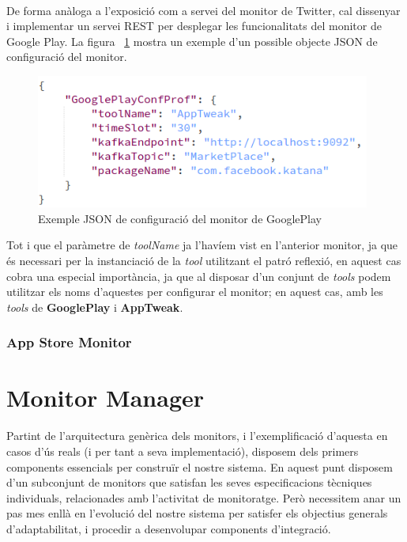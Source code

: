 \\

De forma anàloga a l'exposició com a servei del monitor de Twitter, cal dissenyar i implementar un servei REST per desplegar les funcionalitats del monitor de Google Play. La figura ~\ref{fig:Figura14} mostra un exemple d'un possible objecte JSON de configuració del monitor.\\

\begin{figure}[!h]
\centering
\includegraphics[width=11cm]{Figures/Figure14}
\decoRule
\caption[Exemple JSON de configuració del monitor de GooglePlay]{Exemple JSON de configuració del monitor de GooglePlay}
\label{fig:Figura14}
\end{figure}

Tot i que el paràmetre de \textit{toolName} ja l'havíem vist en l'anterior monitor, ja que és necessari per la instanciació de la \textit{tool} utilitzant el patró reflexió, en aquest cas cobra una especial importància, ja que al disposar d'un conjunt de \textit{tools} podem utilitzar els noms d'aquestes per configurar el monitor; en aquest cas, amb les \textit{tools} de \textbf{GooglePlay} i \textbf{AppTweak}.\\

\subsubsection{App Store Monitor}

\section{Monitor Manager}

Partint de l'arquitectura genèrica dels monitors, i l'exemplificació d'aquesta en casos d'ús reals (i per tant a seva implementació), disposem dels primers components essencials per construïr el nostre sistema. En aquest punt disposem d'un subconjunt de monitors que satisfan les seves especificacions tècniques individuals, relacionades amb l'activitat de monitoratge. Però necessitem anar un pas mes enllà en l'evolució del nostre sistema per satisfer els objectius generals d'adaptabilitat, i procedir a desenvolupar components d'integració.\\

